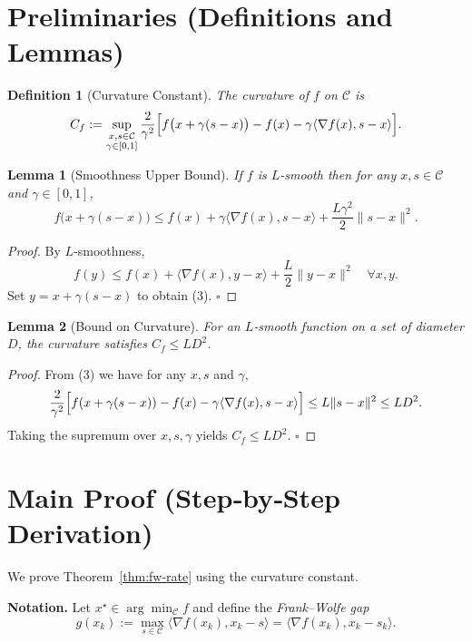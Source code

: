 \documentclass{article}
\newtheorem{lemma}{Lemma}
\newtheorem{definition}{Definition}
\begin{document}
\section*{Preliminaries (Definitions and Lemmas)}
\begin{definition}[Curvature Constant]\label{def:curv}
The curvature of $f$ on $\mathcal{C}$ is
\[
C_f := \sup_{\substack{x,s\in\mathcal{C}\\ \gamma\in[0,1]}}
\frac{2}{\gamma^{2}}\Bigl[f\bigl(x+\gamma(s-x)\bigr)-f(x)-\gamma\langle\nabla f(x),s-x\rangle\Bigr].
\]
\end{definition}
\begin{lemma}[Smoothness Upper Bound]\label{lem:smooth}
If $f$ is $L$‑smooth then for any $x,s\in\mathcal{C}$ and $\gamma\in[0,1]$,
\[
f\bigl(x+\gamma(s-x)\bigr)\le f(x)+\gamma\langle\nabla f(x),s-x\rangle+\frac{L\gamma^{2}}{2}\|s-x\|^{2}. \tag{3}
\]
\end{lemma}
\begin{proof}
By $L$‑smoothness,
\[
f(y)\le f(x)+\langle\nabla f(x),y-x\rangle+\frac{L}{2}\|y-x\|^{2}\quad\forall x,y.
\]
Set $y=x+\gamma(s-x)$ to obtain (3). \hfill $\square$
\end{proof}
\begin{lemma}[Bound on Curvature]\label{lem:curv-bound}
For an $L$‑smooth function on a set of diameter $D$, the curvature satisfies $C_f\le L D^{2}$.
\end{lemma}
\begin{proof}
From (3) we have for any $x,s$ and $\gamma$,
\[
\frac{2}{\gamma^{2}}\Bigl[f(x+\gamma(s-x))-f(x)-\gamma\langle\nabla f(x),s-x\rangle\Bigr]
\le L\|s-x\|^{2}\le L D^{2}.
\]
Taking the supremum over $x,s,\gamma$ yields $C_f\le L D^{2}$. \hfill $\square$
\end{proof}

\section*{Main Proof (Step‑by‑Step Derivation)}
We prove Theorem~\ref{thm:fw-rate} using the curvature constant.

\noindent\textbf{Notation.} Let $x^\star\in\arg\min_{\mathcal{C}}f$ and define the \emph{Frank–Wolfe gap}
\[
g(x_k):=\max_{s\in\mathcal{C}}\langle \nabla f(x_k),x_k-s\rangle
      =\langle \nabla f(x_k),x_k-s_k\rangle .
\]
\end{document}
